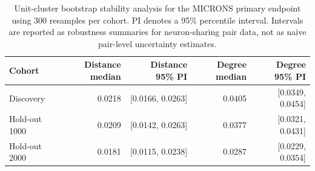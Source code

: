 \begin{table}[t]
\centering
\caption{Unit-cluster bootstrap stability analysis for the MICRONS primary endpoint using 300 resamples per cohort. PI denotes a 95\% percentile interval. Intervals are reported as robustness summaries for neuron-sharing pair data, not as naive pair-level uncertainty estimates.}
\label{tab:microns-bootstrap}
\small
\begin{tabular}{lrrrr}
\toprule
Cohort & Distance median & Distance 95\% PI & Degree median & Degree 95\% PI \\
\midrule
Discovery & 0.0218 & [0.0166, 0.0263] & 0.0405 & [0.0349, 0.0454] \\
Hold-out 1000 & 0.0209 & [0.0142, 0.0263] & 0.0377 & [0.0321, 0.0431] \\
Hold-out 2000 & 0.0181 & [0.0115, 0.0238] & 0.0287 & [0.0229, 0.0354] \\
\bottomrule
\end{tabular}
\end{table}
